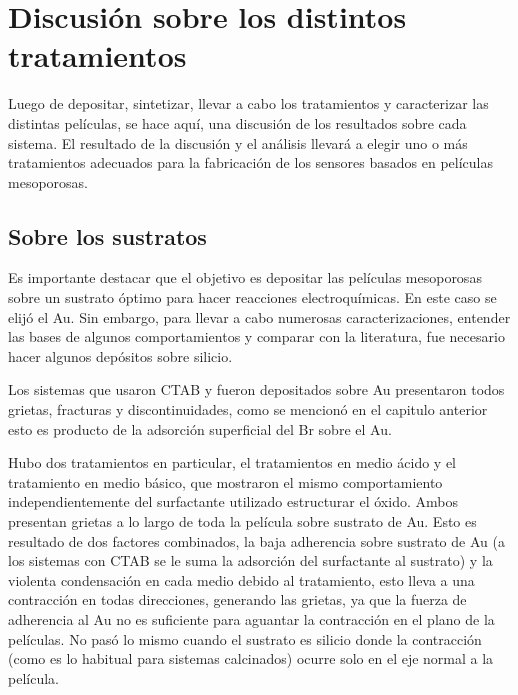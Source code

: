 {\section{Discusión sobre los distintos tratamientos}

		Luego de depositar, sintetizar, llevar a cabo los tratamientos y caracterizar las distintas películas, se hace aquí, una discusión de los resultados sobre cada sistema. El resultado de la discusión y el análisis llevará a elegir uno o más tratamientos adecuados para la fabricación de los sensores basados en películas mesoporosas.
 		
 	\subsection{Sobre los sustratos}
	
		Es importante destacar que el objetivo es depositar las películas mesoporosas sobre un sustrato óptimo para hacer reacciones electroquímicas. En este caso se elijó el Au. Sin embargo, para llevar a cabo numerosas caracterizaciones, entender las bases de algunos comportamientos y comparar con la literatura, fue necesario hacer algunos depósitos sobre silicio.

		Los sistemas que usaron CTAB y fueron depositados sobre Au presentaron todos grietas, fracturas y discontinuidades, como se mencionó en el capitulo anterior esto es producto de la adsorción superficial del Br sobre el Au. 

		Hubo dos tratamientos en particular, el tratamientos en medio ácido y el tratamiento en medio básico, que mostraron el mismo comportamiento independientemente del surfactante utilizado estructurar el óxido. Ambos presentan grietas a lo largo de toda la película sobre sustrato de Au. Esto es resultado de dos factores combinados, la baja adherencia sobre sustrato de Au (a los sistemas con CTAB se le suma la adsorción del surfactante al sustrato) y la violenta condensación en cada medio debido al tratamiento, esto lleva a una contracción en todas direcciones, generando las grietas, ya que la fuerza de adherencia al Au no es suficiente para aguantar la contracción en el plano de la películas. No pasó lo mismo cuando el sustrato es silicio donde la contracción (como es lo habitual para sistemas calcinados) ocurre solo en el eje normal a la película.

}
